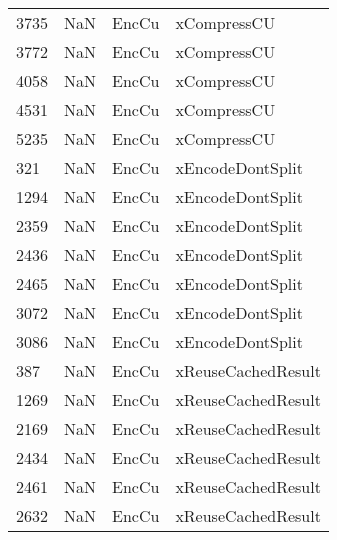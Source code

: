 \begin{tabular}{llll}
3735 &                   NaN &                      EncCu &                               xCompressCU \\
3772 &                   NaN &                      EncCu &                               xCompressCU \\
4058 &                   NaN &                      EncCu &                               xCompressCU \\
4531 &                   NaN &                      EncCu &                               xCompressCU \\
5235 &                   NaN &                      EncCu &                               xCompressCU \\
321  &                   NaN &                      EncCu &                          xEncodeDontSplit \\
1294 &                   NaN &                      EncCu &                          xEncodeDontSplit \\
2359 &                   NaN &                      EncCu &                          xEncodeDontSplit \\
2436 &                   NaN &                      EncCu &                          xEncodeDontSplit \\
2465 &                   NaN &                      EncCu &                          xEncodeDontSplit \\
3072 &                   NaN &                      EncCu &                          xEncodeDontSplit \\
3086 &                   NaN &                      EncCu &                          xEncodeDontSplit \\
387  &                   NaN &                      EncCu &                        xReuseCachedResult \\
1269 &                   NaN &                      EncCu &                        xReuseCachedResult \\
2169 &                   NaN &                      EncCu &                        xReuseCachedResult \\
2434 &                   NaN &                      EncCu &                        xReuseCachedResult \\
2461 &                   NaN &                      EncCu &                        xReuseCachedResult \\
2632 &                   NaN &                      EncCu &                        xReuseCachedResult \\

\end{tabular}
